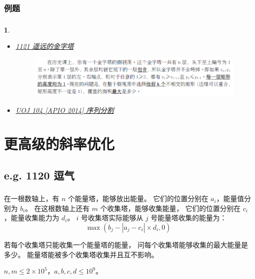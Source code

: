 \documentclass[9pt, UTF8]{beamer} %
\newcommand \fts {\frametitle{\insertsubsection}}
\newcommand \ftss {\frametitle{\insertsubsubsection}}
\newtheorem*{bbox}{}
\begin{document}
	\subsubsection{例题}

	\begin{frame}
		\ftss

		\begin{bbox}
			\begin{itemize}
				\item \href {http://219.153.61.2:9000/problem/1121} {1121 遥远的金字塔}

				\begin{figure}
					\includegraphics[scale=0.45]{pic/pic4.png}
				\end{figure}

				\item \href {http://uoj.ac/problem/104} {UOJ 104 [APIO 2014] 序列分割}
			\end{itemize}
		\end{bbox}
	\end{frame}

	\section{更高级的斜率优化}

	\subsection{e.g. 1120 逗气}

	\begin{frame}
		\fts

		在一根数轴上，有 $n$ 个能量塔，能够放出能量。
		它们的位置分别在 $a_i$，能量值分别为 $b_i$。
		在这根数轴上还有 $m$ 个收集塔，能够收集能量，
		它们的位置分别在 $c_i$，能量收集能力为 $d_i$。
		$i$ 号收集塔实际能够从 $j$ 号能量塔收集的能量为：
		$$
		\max(b_j - |a_j - c_i| \times d_i, 0)
		$$

		若每个收集塔只能收集一个能量塔的能量，
		问每个收集塔能够收集的最大能量是多少。
		能量塔能被多个收集塔收集并且互不影响。

		\bigskip

		$n, m \le 2 \times 10^5$，$a, b, c, d \le 10^9$。
	\end{frame}
\end{document}
